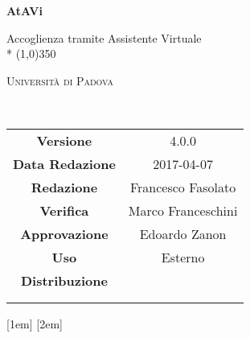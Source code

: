\documentclass[a4paper,12pt]{article}
\date{\today}
\begin{document}
	\begin{titlepage}
		\centering
		{\huge\bfseries AtAVi\par}
		Accoglienza tramite Assistente Virtuale \\*
		\line(1,0){350} \\
		{\scshape\LARGE Università di Padova \par}
		\vspace{1cm}
		{\scshape\Large \glossarioRA\ \par}
		\logo
		\newpage
		\begin{tabular}{c|c}
			{\hfill\textbf{Versione}} 			& 4.0.0			\\ 
			{\hfill\textbf{Data Redazione}} 	& 2017-04-07 		\\ 
			{\hfill\textbf{Redazione}} 			&  Francesco Fasolato \\ 
			{\hfill\textbf{Verifica}} 			& Marco Franceschini  \\ 
			{\hfill\textbf{Approvazione}} 		& Edoardo Zanon				\\
			{\hfill\textbf{Uso}} 				& Esterno 			\\
			{\hfill\textbf{Distribuzione}} 		& \vardanega \\ & \cardin \\ & \prop \\
		\end{tabular}
	\end{titlepage}
	
	\pagestyle{myfront}
	\newpage
		

	\newpage		
		{\vskip 0.7cm}
		{\scshape\bfseries\fontsize{2em}{2em}\selectfont}
		{\itshape}
		{}
		{}
		{}
		{}
		{\titlerule\contentspage}

	\newpage
		\tableofcontents
	
		\label{LastFrontPage}
		\newpage
			\pagestyle{mymain}

			\titleformat{\section}[block]{\bfseries\filcenter\fontsize{23pt}{20pt}\selectfont}{}{1em}{}

			\printglossary[style=myaltlistgroup, title=, toctitle=Glossario dei termini]
			\glsaddall

		\label{LastPage}
\end{document}
